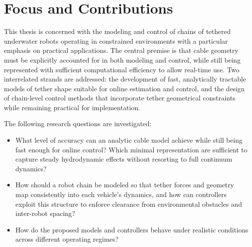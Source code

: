 \section{Focus and Contributions}
\label{i_focus_and_contributions}

This thesis is concerned with the modeling and control of chains of tethered underwater robots
operating in constrained environments with a particular emphasis on practical applications. The
central premise is that cable geometry must be explicitly accounted for in both modeling and
control, while still being represented with sufficient computational efficiency to allow real-time
use. Two interrelated strands are addressed: the development of fast, analytically tractable models
of tether shape suitable for online estimation and control, and the design of chain-level control
methods that incorporate tether geometrical constraints while remaining practical for
implementation.

The following research questions are investigated:
\begin{itemize}
	\item What level of accuracy can an analytic cable model achieve while still being fast enough for online
	      control? Which minimal representation are sufficient to capture steady hydrodynamic effects without
	      resorting to full continuum dynamics?
	\item How should a robot chain be modeled so that tether forces and geometry map consistently into each
	      vehicle's dynamics, and how can controllers exploit this structure to enforce clearance from
	      environmental obstacles and inter-robot spacing?
	\item How do the proposed models and controllers behave under realistic conditions across different
	      operating regimes?
\end{itemize}

